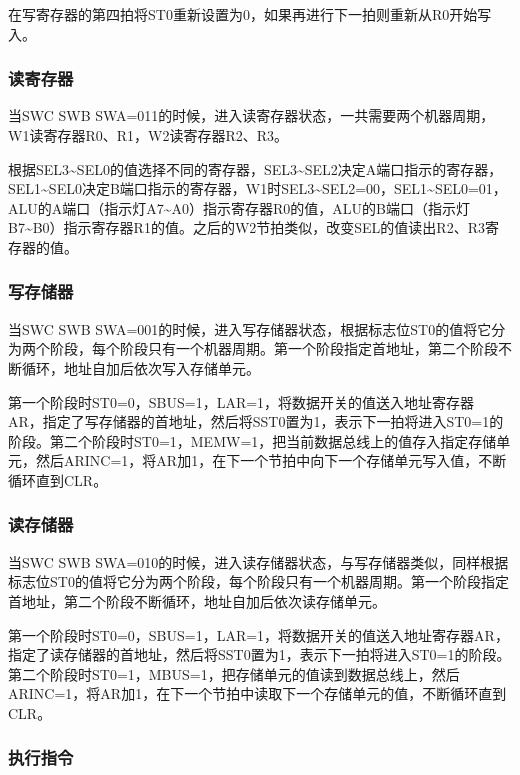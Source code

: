 \documentclass[lang=cn,11pt,a4paper,cite=authornum]{paper}
\begin{document}
在写寄存器的第四拍将ST0重新设置为0，如果再进行下一拍则重新从R0开始写入。

\subsubsection{读寄存器}

当SWC SWB SWA=011的时候，进入读寄存器状态，一共需要两个机器周期，W1读寄存器R0、R1，W2读寄存器R2、R3。

根据SEL3\textasciitilde SEL0的值选择不同的寄存器，SEL3\textasciitilde SEL2决定A端口指示的寄存器，SEL1\textasciitilde SEL0决定B端口指示的寄存器，W1时SEL3\textasciitilde SEL2=00，SEL1\textasciitilde SEL0=01，ALU的A端口（指示灯A7\textasciitilde A0）指示寄存器R0的值，ALU的B端口（指示灯B7\textasciitilde B0）指示寄存器R1的值。之后的W2节拍类似，改变SEL的值读出R2、R3寄存器的值。

\subsubsection{写存储器}

当SWC SWB SWA=001的时候，进入写存储器状态，根据标志位ST0的值将它分为两个阶段，每个阶段只有一个机器周期。第一个阶段指定首地址，第二个阶段不断循环，地址自加后依次写入存储单元。

第一个阶段时ST0=0，SBUS=1，LAR=1，将数据开关的值送入地址寄存器 AR，指定了写存储器的首地址，然后将SST0置为1，表示下一拍将进入ST0=1的阶段。第二个阶段时ST0=1，MEMW=1，把当前数据总线上的值存入指定存储单元，然后ARINC=1，将AR加1，在下一个节拍中向下一个存储单元写入值，不断循环直到CLR。

\subsubsection{读存储器}

当SWC SWB SWA=010的时候，进入读存储器状态，与写存储器类似，同样根据标志位ST0的值将它分为两个阶段，每个阶段只有一个机器周期。第一个阶段指定首地址，第二个阶段不断循环，地址自加后依次读存储单元。

第一个阶段时ST0=0，SBUS=1，LAR=1，将数据开关的值送入地址寄存器AR，指定了读存储器的首地址，然后将SST0置为1，表示下一拍将进入ST0=1的阶段。第二个阶段时ST0=1，MBUS=1，把存储单元的值读到数据总线上，然后ARINC=1，将AR加1，在下一个节拍中读取下一个存储单元的值，不断循环直到CLR。

\subsubsection{执行指令}
\end{document}
